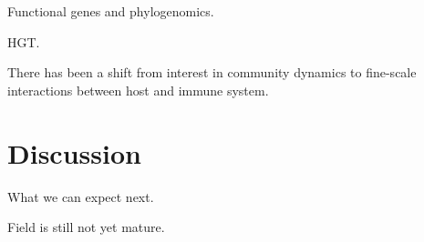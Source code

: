 \documentclass{amsart}
\newcommand{\forarxiv}[1]{#1}
\newcommand{\notforarxiv}[1]{}
\newcommand{\FIGmassTransport}{\
\begin{figure}[ht]
\begin{center}
  \forarxiv{\texttt{[image: mass\_transport.pdf]}}
\end{center}
\caption{\
  Caption goes here.
}
\label{FIGmassTransport}
\end{figure}
}
\begin{document}
Functional genes and phylogenomics.

HGT.

There has been a shift from interest in community dynamics to fine-scale interactions between host and immune system.


\cite{wylie2012sequence}
\cite{chen2012associating}


\section{Discussion}

What we can expect next.

Field is still not yet mature.

\notforarxiv{
\newpage
\section{Figure Legends}
\clearpage

\newpage
}



\end{document}
